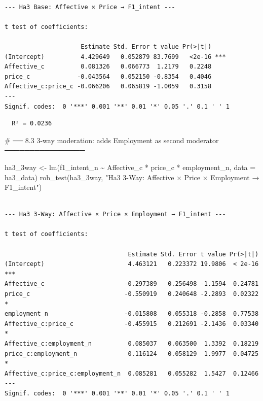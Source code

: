 \documentclass[
  letterpaper,
  DIV=11,
  numbers=noendperiod]{scrartcl}
\newenvironment{Shaded}{\begin{snugshade}}{\end{snugshade}}
\newcommand{\AttributeTok}[1]{\textcolor[rgb]{0.40,0.45,0.13}{#1}}
\newcommand{\CommentTok}[1]{\textcolor[rgb]{0.37,0.37,0.37}{#1}}
\newcommand{\FunctionTok}[1]{\textcolor[rgb]{0.28,0.35,0.67}{#1}}
\newcommand{\NormalTok}[1]{\textcolor[rgb]{0.00,0.23,0.31}{#1}}
\newcommand{\OtherTok}[1]{\textcolor[rgb]{0.00,0.23,0.31}{#1}}
\newcommand{\SpecialCharTok}[1]{\textcolor[rgb]{0.37,0.37,0.37}{#1}}
\newcommand{\StringTok}[1]{\textcolor[rgb]{0.13,0.47,0.30}{#1}}
\begin{document}
\begin{verbatim}

--- Ha3 Base: Affective × Price → F1_intent ---

t test of coefficients:

                     Estimate Std. Error t value Pr(>|t|)    
(Intercept)          4.429649   0.052879 83.7699   <2e-16 ***
Affective_c          0.081326   0.066773  1.2179   0.2248    
price_c             -0.043564   0.052150 -0.8354   0.4046    
Affective_c:price_c -0.066206   0.065819 -1.0059   0.3158    
---
Signif. codes:  0 '***' 0.001 '**' 0.01 '*' 0.05 '.' 0.1 ' ' 1
\end{verbatim}

\begin{Shaded}
\end{Shaded}

\begin{verbatim}
  R² = 0.0236
\end{verbatim}

\begin{Shaded}
\begin{Highlighting}[]
\CommentTok{\# ── 8.3  3{-}way moderation: adds Employment as second moderator ────────────────}

\NormalTok{ha3\_3way }\OtherTok{\textless{}{-}} \FunctionTok{lm}\NormalTok{(f1\_intent\_n }\SpecialCharTok{\textasciitilde{}}\NormalTok{ Affective\_c }\SpecialCharTok{*}\NormalTok{ price\_c }\SpecialCharTok{*}\NormalTok{ employment\_n, }\AttributeTok{data =}\NormalTok{ ha3\_data)}
\FunctionTok{rob\_test}\NormalTok{(ha3\_3way, }\StringTok{"Ha3 3{-}Way: Affective × Price × Employment → F1\_intent"}\NormalTok{)}
\end{Highlighting}
\end{Shaded}

\begin{verbatim}

--- Ha3 3-Way: Affective × Price × Employment → F1_intent ---

t test of coefficients:

                                  Estimate Std. Error t value Pr(>|t|)    
(Intercept)                       4.463121   0.223372 19.9806  < 2e-16 ***
Affective_c                      -0.297389   0.256498 -1.1594  0.24781    
price_c                          -0.550919   0.240648 -2.2893  0.02322 *  
employment_n                     -0.015808   0.055318 -0.2858  0.77538    
Affective_c:price_c              -0.455915   0.212691 -2.1436  0.03340 *  
Affective_c:employment_n          0.085037   0.063500  1.3392  0.18219    
price_c:employment_n              0.116124   0.058129  1.9977  0.04725 *  
Affective_c:price_c:employment_n  0.085281   0.055282  1.5427  0.12466    
---
Signif. codes:  0 '***' 0.001 '**' 0.01 '*' 0.05 '.' 0.1 ' ' 1
\end{verbatim}
\end{document}
